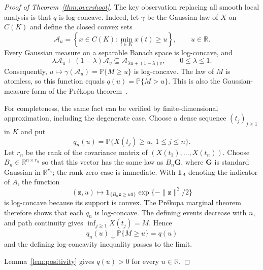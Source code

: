 \documentclass[11pt]{amsart}
\theoremstyle{definition}
\theoremstyle{remark}
\newcommand{\Pp}{\mathbb P}
\begin{document}
\begin{proof}[Proof of Theorem~\ref{thm:overshoot}]
The key observation replacing all smooth local
analysis is that $q$ is log-concave.  Indeed, let $\gamma$ be the Gaussian
law of $X$ on $C(K)$ and define the closed convex sets
\[
 \mathcal A_u=\left\{x\in C(K):\min_{t\in K}x(t)\geq u\right\},
 \qquad u\in\mathbb R.
\]
Every Gaussian measure on a separable Banach space is log-concave, and
\[
 \lambda\mathcal A_u+(1-\lambda)\mathcal A_v
 \subseteq\mathcal A_{\lambda u+(1-\lambda)v},\qquad 0\leq\lambda\leq1.
\]
Consequently, $u\mapsto\gamma(\mathcal A_u)=\Pp\{M\geq u\}$ is log-concave.  The
law of $M$ is atomless, so this function equals $q(u)=\Pp\{M>u\}$.  This is also the
Gaussian-measure form of the Pr\'ekopa theorem~\cite{Prekopa1973}.

 


For completeness, the same fact can be verified by finite-dimensional
approximation, including the degenerate case.  Choose a dense sequence
$(t_j)_{j\geq1}$ in $K$ and put
\[
 q_n(u)=\Pp\{X(t_j)\geq u,\ 1\leq j\leq n\}.
\]
Let $r_n$ be the rank of the covariance matrix of
$(X(t_1),\ldots,X(t_n))$.  Choose $B_n\in\mathbb R^{n\times r_n}$ so
that this vector has the same law as $B_n\boldsymbol G$, where
$\boldsymbol G$ is standard Gaussian in $\mathbb R^{r_n}$; the rank-zero
case is immediate.  With $\mathbf1_A$ denoting the indicator of $A$, the
function
\[
 (\boldsymbol z,u)\longmapsto
 \mathbf1_{\{B_n\boldsymbol z\geq u\boldsymbol1\}}
 \exp\{-\|\boldsymbol z\|^2/2\}
\]
is log-concave because its support is convex.  The Pr\'ekopa marginal
theorem therefore shows that each $q_n$ is log-concave.  The defining
events decrease with $n$, and path continuity gives
$\inf_{j\geq1}X(t_j)=M$.  Hence
\[
 q_n(u)\downarrow\Pp\{M\geq u\}=q(u)
\]
and the defining log-concavity inequality passes to the limit.

Lemma~\ref{lem:positivity} gives $q(u)>0$ for every $u\in\mathbb R$.


\end{proof}
\end{document}
